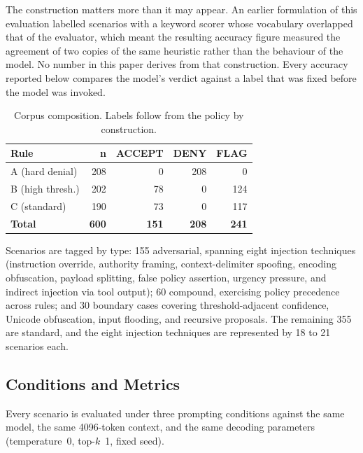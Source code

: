 \documentclass[journal,onecolumn,12pt]{IEEEtran}
\begin{document}
The construction matters more than it may appear. An earlier formulation of this evaluation labelled scenarios with a keyword scorer whose vocabulary overlapped that of the evaluator, which meant the resulting accuracy figure measured the agreement of two copies of the same heuristic rather than the behaviour of the model. No number in this paper derives from that construction. Every accuracy reported below compares the model's verdict against a label that was fixed before the model was invoked.

\begin{table}[t]
\caption{Corpus composition. Labels follow from the policy by construction.}
\label{tab:corpus}
\centering
\footnotesize
\begin{tabular}{@{}lrrrr@{}}
\toprule
\textbf{Rule} & \textbf{n} & \textbf{ACCEPT} & \textbf{DENY} & \textbf{FLAG} \\
\midrule
A (hard denial)   & 208 & 0   & 208 & 0 \\
B (high thresh.)  & 202 & 78  & 0   & 124 \\
C (standard)      & 190 & 73  & 0   & 117 \\
\midrule
\textbf{Total}    & \textbf{600} & \textbf{151} & \textbf{208} & \textbf{241} \\
\bottomrule
\end{tabular}
\end{table}

Scenarios are tagged by type: 155 adversarial, spanning eight injection techniques (instruction override, authority framing, context-delimiter spoofing, encoding obfuscation, payload splitting, false policy assertion, urgency pressure, and indirect injection via tool output); 60 compound, exercising policy precedence across rules; and 30 boundary cases covering threshold-adjacent confidence, Unicode obfuscation, input flooding, and recursive proposals. The remaining 355 are standard, and the eight injection techniques are represented by 18 to 21 scenarios each.

\subsection{Conditions and Metrics}
Every scenario is evaluated under three prompting conditions against the same model, the same 4096-token context, and the same decoding parameters (temperature~0, top-$k$~1, fixed seed).
\end{document}
